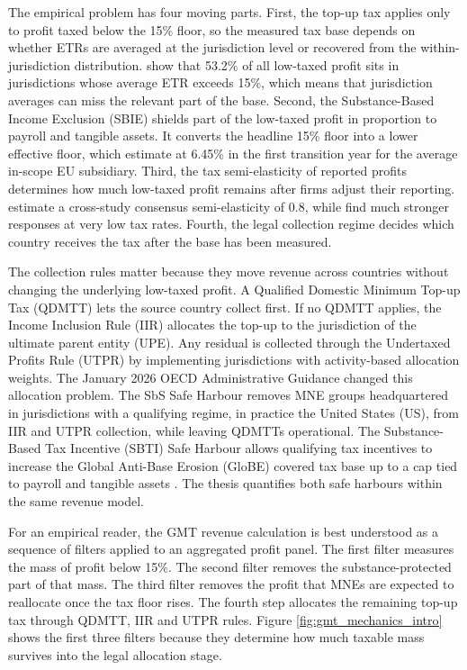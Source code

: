 \documentclass[11pt,a4paper]{article}
\begin{document}
The empirical problem has four moving parts. First, the top-up tax applies only to profit taxed below the 15\% floor, so the measured tax base depends on whether ETRs are averaged at the jurisdiction level or recovered from the within-jurisdiction distribution. \citet{hugger2026} show that 53.2\% of all low-taxed profit sits in jurisdictions whose average ETR exceeds 15\%, which means that jurisdiction averages can miss the relevant part of the base. Second, the Substance-Based Income Exclusion (SBIE) shields part of the low-taxed profit in proportion to payroll and tangible assets. It converts the headline 15\% floor into a lower effective floor, which \citet{devereux2023} estimate at 6.45\% in the first transition year for the average in-scope EU subsidiary. Third, the tax semi-elasticity of reported profits determines how much low-taxed profit remains after firms adjust their reporting. \citet{heckemeyer2017} estimate a cross-study consensus semi-elasticity of 0.8, while \citet{dowd2017} find much stronger responses at very low tax rates. Fourth, the legal collection regime decides which country receives the tax after the base has been measured.

The collection rules matter because they move revenue across countries without changing the underlying low-taxed profit. A Qualified Domestic Minimum Top-up Tax (QDMTT) lets the source country collect first. If no QDMTT applies, the Income Inclusion Rule (IIR) allocates the top-up to the jurisdiction of the ultimate parent entity (UPE). Any residual is collected through the Undertaxed Profits Rule (UTPR) by implementing jurisdictions with activity-based allocation weights. The January 2026 OECD Administrative Guidance changed this allocation problem. The SbS Safe Harbour removes MNE groups headquartered in jurisdictions with a qualifying regime, in practice the United States (US), from IIR and UTPR collection, while leaving QDMTTs operational. The Substance-Based Tax Incentive (SBTI) Safe Harbour allows qualifying tax incentives to increase the Global Anti-Base Erosion (GloBE) covered tax base up to a cap tied to payroll and tangible assets \citep{oecd2026}. The thesis quantifies both safe harbours within the same revenue model.

For an empirical reader, the GMT revenue calculation is best understood as a sequence of filters applied to an aggregated profit panel. The first filter measures the mass of profit below 15\%. The second filter removes the substance-protected part of that mass. The third filter removes the profit that MNEs are expected to reallocate once the tax floor rises. The fourth step allocates the remaining top-up tax through QDMTT, IIR and UTPR rules. Figure \ref{fig:gmt_mechanics_intro} shows the first three filters because they determine how much taxable mass survives into the legal allocation stage.
\end{document}
